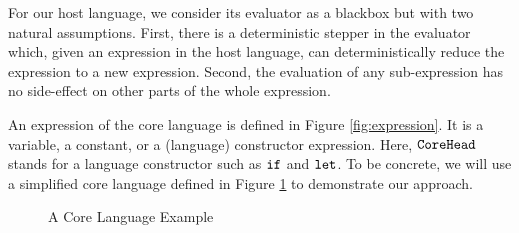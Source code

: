 For our host language, we consider its evaluator as a blackbox %
but with two natural assumptions. First, there is a deterministic stepper in the evaluator which, given an expression in the host language, can deterministically reduce the expression to a new expression. Second, the evaluation of any sub-expression has no side-effect on other parts of the whole expression.

An expression of the core language is defined in Figure \ref{fig:expression}. It is a variable, a constant, or a (language) constructor expression. Here, $\mbox{\tt CoreHead}$ stands for a language constructor such as $\mbox{\tt if}$ and $\mbox{\tt let}$. To be concrete, we will use a simplified core language defined in Figure \ref{fig:core} to demonstrate our approach. 

\begin{figure}[thb]
\begin{centering}
	\framebox[36em][c]{
		\parbox[t]{33em}{
			\[
			\begin{array}{lcl}
			\m{CoreExp} &::=& \Code{(CoreExp~CoreExp~...)} ~~\note{// apply}\\
			&|& \m{(lambda~(x~...)~CoreExp)} ~~\note{// call-by-value}\\
			&|& \m{(lambdaN~(x~...)~CoreExp)} ~~\note{// call-by-need}\\
			&|& \m{(if~CoreExp~CoreExp~CoreExp)}\\
			&|& \m{(let~(x~CoreExp)~CoreExp)}\\
			&|& \m{(first~CoreExp)}\\
			&|& \m{(empty~CoreExp)}\\
			&|& \m{(rest~CoreExp)}\\
			&|& \m{(cons~CoreExp~CoreExp)}\\
			&|& \m{(arithop~CoreExp~CoreExp)} ~~\note{// +, -, *, /, >, <, =}\\
			&|& \m{x}\\
			&|& \m{c} ~~\note{// boolean, number and list}
			\end{array}
			\]
		}
	}
\end{centering}
\caption{A Core Language Example}
\label{fig:core}
\end{figure}



